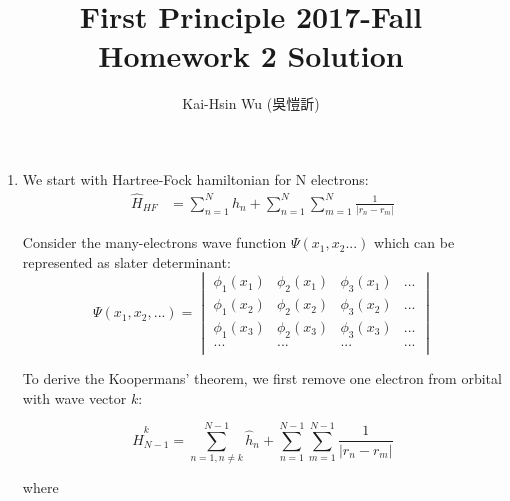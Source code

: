 \documentclass[notitlepage]{revtex4-1}
\begin{document}
\begin{CJK}{UTF8}{bsmi}
\title{First Principle 2017-Fall  Homework 2 Solution}
\author{Kai-Hsin Wu (吳愷訢)}

\maketitle

\begin{enumerate}	
	\item We start with Hartree-Fock hamiltonian for N electrons:
	\begin{align*}
		\hat{H}_{HF} &= \sum_{n=1}^{N} \hat{h}_n + \sum_{n=1}^{N}\sum_{m=1}^{N} \frac{1}{|r_n - r_m|} 
	\end{align*} 
	
	Consider the many-electrons wave function $\Psi(x_1,x_2...)$ which can be represented as slater determinant:	
	\begin{equation*}
		\Psi(x_1, x_2, ...) = 
		\begin{vmatrix}
			\phi_{1}(x_1) & \phi_{2}(x_1) & \phi_{3}(x_1) & ... \\
			\phi_{1}(x_2) & \phi_{2}(x_2) & \phi_{3}(x_2) &... \\
			\phi_{1}(x_3) & \phi_{2}(x_3) & \phi_{3}(x_3) &... \\
			... &  ... & ... & ... \\
		\end{vmatrix}
	\end{equation*}

	To derive the Koopermans' theorem, we first remove one electron from orbital with wave vector $k$:
	
	\begin{equation*}
		\hat{H}_{N-1}^{k} = \sum_{n=1,n\neq k}^{N-1} \hat{h}_{n} + \sum_{n=1}^{N-1} \sum_{m=1}^{N-1} \frac{1}{|r_n - r_m|} 
	\end{equation*} 
	
	where 


	
\end{enumerate}






	
\end{CJK}
\end{document}
